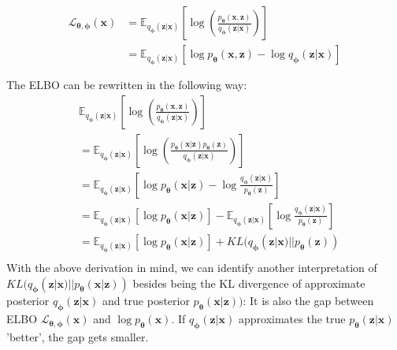 \documentclass[12pt]{report}
\theoremstyle{definition}
\begin{document}
\begin{equation}
\begin{split}
	\mathcal{L}_{\mathbf{\theta}, \mathbf{\phi}}(\mathbf{x}) 
	& = \mathbb{E}_{q_{\mathbf{\phi}}(\mathbf{z}|\mathbf{x})}\left[ \log\left(\frac{p_{\mathbf{\theta}}(\mathbf{x}, \mathbf{z})}{q_{\mathbf{\phi}}(\mathbf{z}|\mathbf{x})}\right) \right] \\
	& = \mathbb{E}_{q_{\mathbf{\phi}}(\mathbf{z}|\mathbf{x})}\left[ \log p_{\mathbf{\theta}}(\mathbf{x}, \mathbf{z}) - \log q_{\mathbf{\phi}}(\mathbf{z}|\mathbf{x}) \right] \\\\
\end{split}
\end{equation}
The ELBO can be rewritten in the following way:
\begin{equation}
\begin{split}
& \mathbb{E}_{q_{\mathbf{\phi}}(\mathbf{z}|\mathbf{x})}\left[ \log\left(\frac{p_{\mathbf{\theta}}(\mathbf{x}, \mathbf{z})}{q_{\mathbf{\phi}}(\mathbf{z}|\mathbf{x})}\right) \right] \\
& = \mathbb{E}_{q_{\mathbf{\phi}}(\mathbf{z}|\mathbf{x})}\left[ \log\left(\frac{p_{\mathbf{\theta}}(\mathbf{x}|\mathbf{z})p_{\mathbf{\theta}}(\mathbf{z})}{q_{\mathbf{\phi}}(\mathbf{z}|\mathbf{x})}\right) \right] \\
	& = \mathbb{E}_{q_{\mathbf{\phi}}(\mathbf{z}|\mathbf{x})}\left[ \log p_{\mathbf{\theta}}(\mathbf{x}| \mathbf{z}) - \log \frac{q_{\mathbf{\phi}}(\mathbf{z}|\mathbf{x})}{p_{\mathbf{\theta}}(\mathbf{z})} \right]	\\
	& = \mathbb{E}_{q_{\mathbf{\phi}}(\mathbf{z}|\mathbf{x})}\left[ \log p_{\mathbf{\theta}}(\mathbf{x}| \mathbf{z})\right] - \mathbb{E}_{q_{\mathbf{\phi}}(\mathbf{z}|\mathbf{x})}\left[\log \frac{q_{\mathbf{\phi}}(\mathbf{z}|\mathbf{x})}{p_{\mathbf{\theta}}(\mathbf{z})} \right]	\\
	& = \mathbb{E}_{q_{\mathbf{\phi}}(\mathbf{z}|\mathbf{x})}\left[ \log p_{\mathbf{\theta}}(\mathbf{x}| \mathbf{z})\right] + KL(q_{\mathbf{\phi}}(\mathbf{z}|\mathbf{x})||p_{\mathbf{\theta}}(\mathbf{z}))\\	
\end{split}
\end{equation}
With the above derivation in mind, we can identify another interpretation of $KL(q_{\mathbf{\phi}}(\mathbf{z}|\mathbf{x}) || p_{\mathbf{\theta}}(\mathbf{x}|\mathbf{z}))$ besides being the KL divergence of approximate posterior $q_{\mathbf{\phi}}(\mathbf{z}|\mathbf{x})$ and true posterior $p_{\mathbf{\theta}}(\mathbf{x}| \mathbf{z}))$: It is also the gap between ELBO $\mathcal{L}_{\mathbf{\theta}, \mathbf{\phi}}(\mathbf{x})$ and $\log p_{\mathbf{\theta}}(\mathbf{x})$. If $q_{\mathbf{\phi}}(\mathbf{z}|\mathbf{x})$ approximates the true $p_{\mathbf{\theta}}(\mathbf{z}|\mathbf{x})$ 'better', the gap gets smaller.
\end{document}
